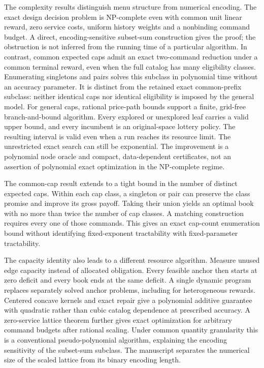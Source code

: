 The complexity results distinguish menu structure from numerical encoding. The exact design decision problem is NP-complete even with common unit linear reward, zero service costs, uniform history weights and a nonbinding command budget. A direct, encoding-sensitive subset-sum construction gives the proof; the obstruction is not inferred from the running time of a particular algorithm. In contrast, common expected caps admit an exact two-command reduction under a common terminal reward, even when the full catalog has many eligibility classes. Enumerating singletons and pairs solves this subclass in polynomial time without an accuracy parameter. It is distinct from the retained exact common-prefix subclass: neither identical caps nor identical eligibility is imposed by the general model. For general caps, rational price-path bounds support a finite, grid-free branch-and-bound algorithm. Every explored or unexplored leaf carries a valid upper bound, and every incumbent is an original-space lottery policy. The resulting interval is valid even when a run reaches its resource limit. The unrestricted exact search can still be exponential. The improvement is a polynomial node oracle and compact, data-dependent certificates, not an assertion of polynomial exact optimization in the NP-complete regime.

The common-cap result extends to a tight bound in the number of distinct expected caps. Within each cap class, a singleton or pair can preserve the class promise and improve its gross payoff. Taking their union yields an optimal book with no more than twice the number of cap classes. A matching construction requires every one of those commands. This gives an exact cap-count enumeration bound without identifying fixed-exponent tractability with fixed-parameter tractability.

The capacity identity also leads to a different resource algorithm. Measure unused edge capacity instead of allocated obligation. Every feasible anchor then starts at zero deficit and every book ends at the same deficit. A single dynamic program replaces separately solved anchor problems, including for heterogeneous rewards. Centered concave kernels and exact repair give a polynomial additive guarantee with quadratic rather than cubic catalog dependence at prescribed accuracy. A zero-service lattice theorem further gives exact optimization for arbitrary command budgets after rational scaling. Under common quantity granularity this is a conventional pseudo-polynomial algorithm, explaining the encoding sensitivity of the subset-sum subclass. The manuscript separates the numerical size of the scaled lattice from its binary encoding length.


